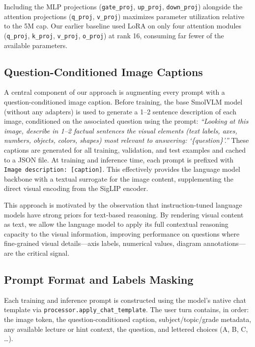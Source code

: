 \documentclass[11pt]{article}
\begin{document}
Including the MLP projections (\texttt{gate\_proj}, \texttt{up\_proj}, \texttt{down\_proj}) alongside the attention projections (\texttt{q\_proj}, \texttt{v\_proj}) maximizes parameter utilization relative to the 5M cap. Our earlier baseline used LoRA on only four attention modules (\texttt{q\_proj}, \texttt{k\_proj}, \texttt{v\_proj}, \texttt{o\_proj}) at rank 16, consuming far fewer of the available parameters.

\subsection{Question-Conditioned Image Captions}
\label{sec:captions}

A central component of our approach is augmenting every prompt with a question-conditioned image caption. Before training, the base SmolVLM model (without any adapters) is used to generate a 1--2 sentence description of each image, conditioned on the associated question using the prompt: \textit{``Looking at this image, describe in 1--2 factual sentences the visual elements (text labels, axes, numbers, objects, colors, shapes) most relevant to answering: `\{question\}'.''} These captions are generated for all training, validation, and test examples and cached to a JSON file. At training and inference time, each prompt is prefixed with \texttt{Image description: [caption]}. This effectively provides the language model backbone with a textual surrogate for the image content, supplementing the direct visual encoding from the SigLIP encoder.

This approach is motivated by the observation that instruction-tuned language models have strong priors for text-based reasoning. By rendering visual content as text, we allow the language model to apply its full contextual reasoning capacity to the visual information, improving performance on questions where fine-grained visual details---axis labels, numerical values, diagram annotations---are the critical signal.

\subsection{Prompt Format and Labels Masking}

Each training and inference prompt is constructed using the model's native chat template via \texttt{processor.apply\_chat\_template}. The user turn contains, in order: the image token, the question-conditioned caption, subject/topic/grade metadata, any available lecture or hint context, the question, and lettered choices (A, B, C, \ldots).
\end{document}
